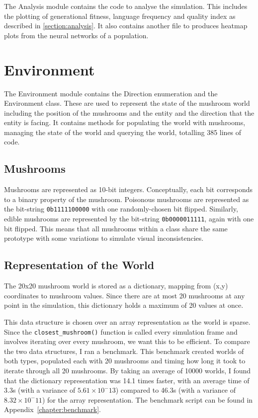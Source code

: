 \documentclass[12pt,a4paper]{report}
\begin{document}
The Analysis module contains the code to analyse the simulation. This includes the plotting of generational fitness, language frequency and quality index as described in \cref{section:analysis}. It also contains another file to produces heatmap plots from the neural networks of a population.

\section{Environment}\label{section:impl-env}

The Environment module contains the Direction enumeration and the Environment class. These are used to represent the state of the mushroom world including the position of the mushrooms and the entity and the direction that the entity is facing. It contains methods for populating the world with mushrooms, managing the state of the world and querying the world, totalling 385 lines of code.

\subsection{Mushrooms}\label{section:mushrooms}

Mushrooms are represented as 10-bit integers. Conceptually, each bit corresponds to a binary property of the mushroom. Poisonous mushrooms are represented as the bit-string \verb!0b1111100000! with one randomly-chosen bit flipped. Similarly, edible mushrooms are represented by the bit-string \verb~0b0000011111~, again with one bit flipped. This means that all mushrooms within a class share the same prototype with some variations to simulate visual inconsistencies. %

\subsection{Representation of the World}\label{section:representation-of-world}

The 20x20 mushroom world is stored as a dictionary, mapping from (x,y) coordinates to mushroom values. Since there are at most 20 mushrooms at any point in the simulation, this dictionary holds a maximum of 20 values at once.

This data structure is chosen over an array representation as the world is sparse. Since the \texttt{closest\_mushroom()} function is called every simulation frame and involves iterating over every mushroom, we want this to be efficient. To compare the two data structures, I ran a benchmark. This benchmark created worlds of both types, populated each with 20 mushrooms and timing how long it took to iterate through all 20 mushrooms. By taking an average of 10000 worlds, I found that the dictionary representation was 14.1 times faster, with an average time of 3.3\textmu s (with a variance of $5.61\times10^-13$) compared to 46.3\textmu s (with a variance of $8.32\times10^-11$) for the array representation. The benchmark script can be found in Appendix~\ref{chapter:benchmark}.
\end{document}
